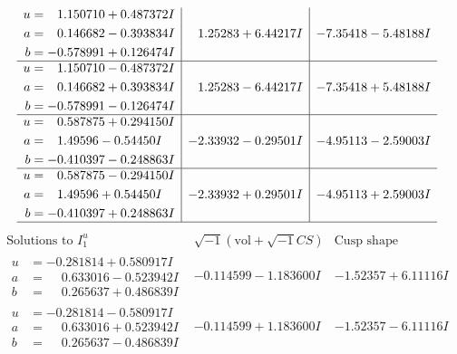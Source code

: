 \documentclass[1p]{elsarticle_modified}
\theoremstyle{definition}
\newcommand{\I}{\sqrt{-1}}
\begin{document}
$$\begin{array}{c|c|c}
\begin{aligned}
u &= \phantom{-}1.150710 + 0.487372 I \\
a &= \phantom{-}0.146682 - 0.393834 I \\
b &= -0.578991 + 0.126474 I\end{aligned}
 & \phantom{-}1.25283 + 6.44217 I & -7.35418 - 5.48188 I \\ \hline\begin{aligned}
u &= \phantom{-}1.150710 - 0.487372 I \\
a &= \phantom{-}0.146682 + 0.393834 I \\
b &= -0.578991 - 0.126474 I\end{aligned}
 & \phantom{-}1.25283 - 6.44217 I & -7.35418 + 5.48188 I \\ \hline\begin{aligned}
u &= \phantom{-}0.587875 + 0.294150 I \\
a &= \phantom{-}1.49596 - 0.54450 I \\
b &= -0.410397 - 0.248863 I\end{aligned}
 & -2.33932 - 0.29501 I & -4.95113 - 2.59003 I \\ \hline\begin{aligned}
u &= \phantom{-}0.587875 - 0.294150 I \\
a &= \phantom{-}1.49596 + 0.54450 I \\
b &= -0.410397 + 0.248863 I\end{aligned}
 & -2.33932 + 0.29501 I & -4.95113 + 2.59003 I\\
 \hline 
 \end{array}$$\newpage$$\begin{array}{c|c|c}  
\text{Solutions to }I^u_{1}& \I (\text{vol} + \sqrt{-1}CS) & \text{Cusp shape}\\
 \hline 
\begin{aligned}
u &= -0.281814 + 0.580917 I \\
a &= \phantom{-}0.633016 - 0.523942 I \\
b &= \phantom{-}0.265637 + 0.486839 I\end{aligned}
 & -0.114599 - 1.183600 I & -1.52357 + 6.11116 I \\ \hline\begin{aligned}
u &= -0.281814 - 0.580917 I \\
a &= \phantom{-}0.633016 + 0.523942 I \\
b &= \phantom{-}0.265637 - 0.486839 I\end{aligned}
 & -0.114599 + 1.183600 I & -1.52357 - 6.11116 I \\ \hline\begin{aligned}

\end{aligned}
\end{array}$$
\end{document}
